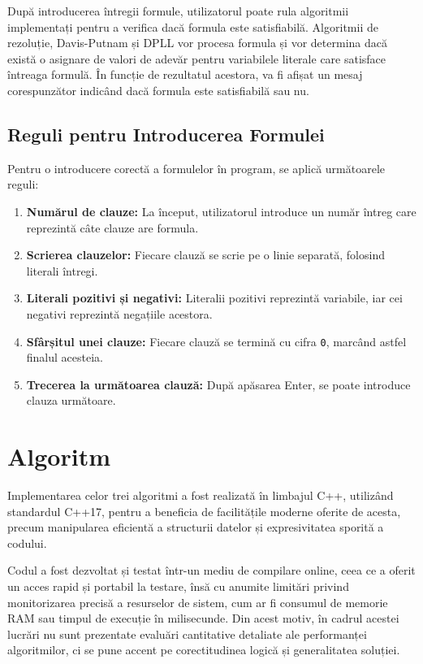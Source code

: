 \documentclass[12pt,a4paper]{article}
\begin{document}
După introducerea întregii formule, utilizatorul poate rula algoritmii implementați pentru a verifica dacă formula este satisfiabilă. Algoritmii de rezoluție, Davis-Putnam și DPLL vor procesa formula și vor determina dacă există o asignare de valori de adevăr pentru variabilele literale care satisface întreaga formulă. În funcție de rezultatul acestora, va fi afișat un mesaj corespunzător indicând dacă formula este satisfiabilă sau nu.

\subsection{Reguli pentru Introducerea Formulei}

Pentru o introducere corectă a formulelor în program, se aplică următoarele reguli:

\begin{enumerate}
    \item \textbf{Numărul de clauze:} La început, utilizatorul introduce un număr întreg care reprezintă câte clauze are formula.
    \item \textbf{Scrierea clauzelor:} Fiecare clauză se scrie pe o linie separată, folosind literali întregi.
    \item \textbf{Literali pozitivi și negativi:} Literalii pozitivi reprezintă variabile, iar cei negativi reprezintă negațiile acestora.
    \item \textbf{Sfârșitul unei clauze:} Fiecare clauză se termină cu cifra \texttt{0}, marcând astfel finalul acesteia.
    \item \textbf{Trecerea la următoarea clauză:} După apăsarea Enter, se poate introduce clauza următoare.
\end{enumerate}


\section{Algoritm}
Implementarea celor trei algoritmi a fost realizată în limbajul C++, utilizând standardul C++17, pentru a beneficia de facilitățile moderne oferite de acesta, precum manipularea eficientă a structurii datelor și expresivitatea sporită a codului.

Codul a fost dezvoltat și testat într-un mediu de compilare online, ceea ce a oferit un acces rapid și portabil la testare, însă cu anumite limitări privind monitorizarea precisă a resurselor de sistem, cum ar fi consumul de memorie RAM sau timpul de execuție în milisecunde. Din acest motiv, în cadrul acestei lucrări nu sunt prezentate evaluări cantitative detaliate ale performanței algoritmilor, ci se pune accent pe corectitudinea logică și generalitatea soluției.
\end{document}

